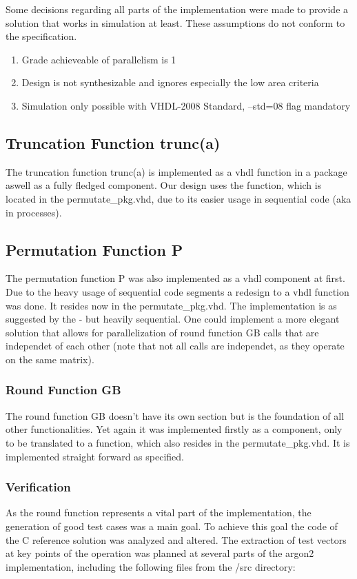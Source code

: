 Some decisions regarding all parts of the implementation were made to provide a
solution that works in simulation at least. These assumptions do not conform to the specification.

\begin{enumerate}
\item Grade achieveable of parallelism is 1
\item Design is not synthesizable and ignores especially the low area criteria
\item Simulation only possible with VHDL-2008 Standard, --std=08 flag mandatory
\end{enumerate}

\subsection{Truncation Function trunc(a)}
The truncation function trunc(a) is implemented as a vhdl function in a package aswell as a
fully fledged component. Our design uses the function, which is located in the
permutate_pkg.vhd, due to its easier usage in sequential code (aka in processes).
\subsection{Permutation Function P}
The permutation function P was also implemented as a vhdl component at first.
Due to the heavy usage of sequential code segments a redesign to a vhdl function was 
done. It resides now in the permutate_pkg.vhd.
The implementation is as suggested by the \autocite{irtf-draft} - but heavily sequential.
One could implement a more elegant solution that allows for parallelization of round
function GB calls that are independet of each other (note that not all calls are
independet, as they operate on the same matrix). 
\subsubsection{Round Function GB}
The round function GB doesn't have its own section but is the foundation of all other
functionalities. 
Yet again it was implemented firstly as a component, only to be translated to a function,
which also resides in the permutate_pkg.vhd. 
It is implemented straight forward as specified.

\subsubsection{Verification}
As the round function represents a vital part of the implementation, the generation of
good test cases was a main goal. To achieve this goal the code of the C reference solution
\autocite{argon2-github}
was analyzed and altered.
The extraction of test vectors at key points of the operation was planned at several parts
of the argon2 implementation, including the following files from the /src directory:

